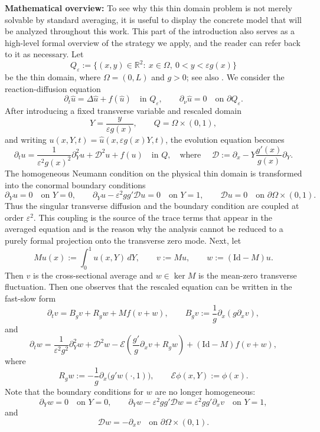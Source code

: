 \documentclass[11pt]{article}
\theoremstyle{definition}
\theoremstyle{remark}
\numberwithin{equation}{section}
\newcommand{\mc}[1]{\mathcal{#1}}
\begin{document}
\textbf{Mathematical overview:}
To see why this thin domain problem is not merely solvable by standard averaging, it is useful to display the concrete model that will be analyzed throughout this work. This part of the introduction also serves as a high-level formal overview of the strategy we apply, and the reader can refer back to it as necessary. Let 
\[ Q_\varepsilon := \{(x,y)\in\mathbb R^2:\ x\in\Omega,\ 0<y<\varepsilon g(x)\} \]
be the thin domain, where \(\Omega=(0,L)\) and \(g>0\); see also .
We consider the reaction-diffusion equation
\[ \partial_t \widehat u = \Delta \widehat u + f(\widehat u) \quad \text{in } Q_\varepsilon, \qquad \partial_\nu \widehat u =0 \quad \text{on } \partial Q_\varepsilon . \]
After introducing a fixed transverse variable and rescaled domain
\[ Y=\frac{y}{\varepsilon g(x)}, \qquad Q=\Omega\times(0,1), \]
and writing \(u(x,Y,t)=\widehat u(x,\varepsilon g(x)Y,t)\), the evolution equation becomes 
\[ \partial_t u = \frac{1}{\varepsilon^2 g(x)^2}\partial_Y^2 u + \mc D^2u + f(u)\quad \text{in } Q, \quad \text{where }\quad\mc D:=\partial_x-Y\frac{g'(x)}{g(x)}\partial_Y . \]
The homogeneous Neumann condition on the physical thin domain is transformed into the conormal boundary conditions 
\[ \partial_Y u=0 \quad \text{on } Y=0, \qquad \partial_Y u-\varepsilon^2 gg'\mc Du=0 \quad \text{on } Y=1, \qquad \mc Du=0 \quad \text{on } \partial\Omega\times(0,1). \] 
Thus the singular transverse diffusion and the boundary condition are coupled at order \(\varepsilon^2\). 
This coupling is the source of the trace terms that appear in the averaged equation and is the reason why the analysis cannot be reduced to a purely formal projection onto the transverse zero mode. Next, let 
\[ Mu(x):=\int_0^1 u(x,Y)\,dY, \qquad v:=Mu, \qquad w:=(\mathrm{Id}-M)u . \]
Then \(v\) is the cross-sectional average and \(w\in\ker M\) is the mean-zero transverse fluctuation. Then one observes that the rescaled equation can be written in the fast-slow form 
\[ \partial_t v = B_g v+R_g w+Mf(v+w), \qquad B_g v:=\frac1g\partial_x(g\partial_xv), \]
and 
\[ \partial_t w = \frac{1}{\varepsilon^2g^2}\partial_Y^2 w + \mc D^2w - \mc E\left(\frac{g'}g\partial_xv+R_gw\right) + (\mathrm{Id}-M)f(v+w), \]
where 
\[ R_gw:=-\frac1g\partial_x\bigl(g'w(\cdot,1)\bigr), \qquad \mc E\phi(x,Y):=\phi(x). \]
Note that the boundary conditions for \(w\) are no longer homogeneous: 
\[ \partial_Yw=0 \quad \text{on } Y=0, \qquad \partial_Yw-\varepsilon^2gg'\mc Dw = \varepsilon^2gg'\partial_xv \quad \text{on } Y=1, \]
and 
\[ \mc Dw=-\partial_xv \quad \text{on } \partial\Omega\times(0,1). \]
\end{document}
